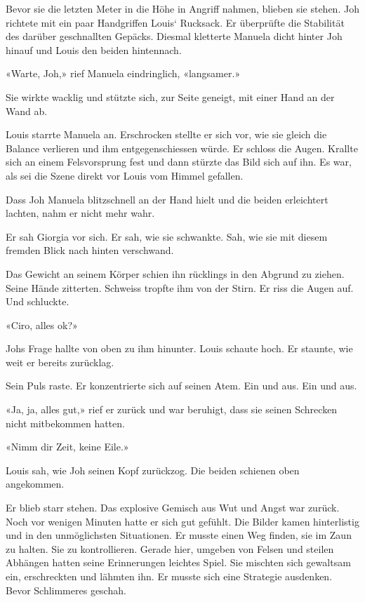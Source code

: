 Bevor sie die letzten Meter in die Höhe in Angriff nahmen, blieben sie
stehen. Joh richtete mit ein paar Handgriffen Louis` Rucksack. Er
überprüfte die Stabilität des darüber geschnallten Gepäcks. Diesmal
kletterte Manuela dicht hinter Joh hinauf und Louis den beiden
hintennach.

«Warte, Joh,» rief Manuela eindringlich, «langsamer.»

Sie wirkte wacklig und stützte sich, zur Seite geneigt, mit einer Hand
an der Wand ab.

Louis starrte Manuela an. Erschrocken stellte er sich vor, wie sie
gleich die Balance verlieren und ihm entgegenschiessen würde. Er schloss
die Augen. Krallte sich an einem Felsvorsprung fest und dann stürzte das
Bild sich auf ihn. Es war, als sei die Szene direkt vor Louis vom Himmel
gefallen.

Dass Joh Manuela blitzschnell an der Hand hielt und die beiden
erleichtert lachten, nahm er nicht mehr wahr.

Er sah Giorgia vor sich. Er sah, wie sie schwankte. Sah, wie sie mit
diesem fremden Blick nach hinten verschwand.

Das Gewicht an seinem Körper schien ihn rücklings in den Abgrund zu
ziehen. Seine Hände zitterten. Schweiss tropfte ihm von der Stirn. Er
riss die Augen auf. Und schluckte.

«Ciro, alles ok?»

Johs Frage hallte von oben zu ihm hinunter. Louis schaute hoch. Er
staunte, wie weit er bereits zurücklag.

Sein Puls raste. Er konzentrierte sich auf seinen Atem. Ein und aus. Ein
und aus.

«Ja, ja, alles gut,» rief er zurück und war beruhigt, dass sie seinen
Schrecken nicht mitbekommen hatten.

«Nimm dir Zeit, keine Eile.»

Louis sah, wie Joh seinen Kopf zurückzog. Die beiden schienen oben
angekommen.

Er blieb starr stehen. Das explosive Gemisch aus Wut und Angst war
zurück. Noch vor wenigen Minuten hatte er sich gut gefühlt. Die Bilder
kamen hinterlistig und in den unmöglichsten Situationen. Er musste einen
Weg finden, sie im Zaun zu halten. Sie zu kontrollieren. Gerade hier,
umgeben von Felsen und steilen Abhängen hatten seine Erinnerungen
leichtes Spiel. Sie mischten sich gewaltsam ein, erschreckten und
lähmten ihn. Er musste sich eine Strategie ausdenken. Bevor Schlimmeres
geschah.

